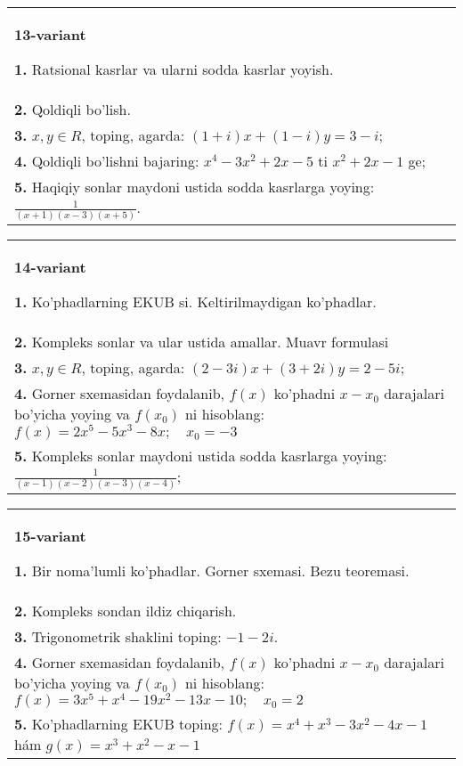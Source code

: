 \documentclass{article}
\begin{document}
\begin{tabular}{m{17cm}}
\textbf{13-variant}
\newline

\textbf{1.} Ratsional kasrlar va ularni sodda kasrlar yoyish. \\
\textbf{2.} Qoldiqli bo’lish.  \\
\textbf{3.}  $x, y \in R$, toping, agarda:  $(1+i) x+(1-i) y=3-i$; \\
\textbf{4.} Qoldiqli bo’lishni bajaring: $x^4-3 x^2+2 x-5$ ti $x^2+2 x-1$ ge; \\
\textbf{5.} Haqiqiy sonlar maydoni ustida sodda kasrlarga yoying:  $\frac{1}{(x+1)(x-3)(x+5)}$. \\

\end{tabular}
\vspace{1cm}


\begin{tabular}{m{17cm}}
\textbf{14-variant}
\newline

\textbf{1.} Ko’phadlarning EKUB si. Keltirilmaydigan ko’phadlar. \\
\textbf{2.} Kompleks sonlar va ular ustida amallar. Muavr formulasi  \\
\textbf{3.}  $x, y \in R$, toping, agarda: $(2-3 i) x+(3+2 i) y=2-5 i$; \\
\textbf{4.} Gorner sxemasidan foydalanib, $f(x)$ ko’phadni $x-x_0$ darajalari bo’yicha yoying va $f\left(x_0\right)$ ni hisoblang: $f(x)=2 x^5-5 x^3-8 x ; \quad x_0=-3$ \\
\textbf{5.} Kompleks sonlar maydoni ustida sodda kasrlarga yoying:$\frac{1}{(x-1)(x-2)(x-3)(x-4)}$; \\

\end{tabular}
\vspace{1cm}


\begin{tabular}{m{17cm}}
\textbf{15-variant}
\newline

\textbf{1.} Bir noma’lumli ko’phadlar. Gorner sxemasi. Bezu teoremasi.  \\
\textbf{2.} Kompleks sondan ildiz chiqarish. \\
\textbf{3.} Trigonometrik shaklini toping: $-1-2 i$. \\
\textbf{4.} Gorner sxemasidan foydalanib, $f(x)$ ko’phadni $x-x_0$ darajalari bo’yicha yoying va $f\left(x_0\right)$ ni hisoblang: $f(x)=3 x^5+x^4-19 x^2-13 x-10 ; \quad x_0=2$ \\
\textbf{5.} Ko’phadlarning EKUB toping:  $f(x)=x^4+x^3-3 x^2-4 x-1$ hám $g(x)=x^3+x^2-x-1$ \\

\end{tabular}
\vspace{1cm}
\end{document}
